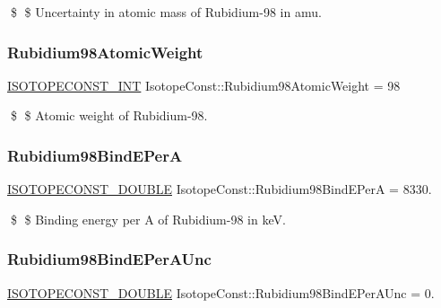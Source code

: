 \$ \$ Uncertainty in atomic mass of Rubidium-\/98 in amu. \mbox{\label{group___isotope_const-_rubidium-_rb98_ga1569a0c394f855620b03ae0b3e708c9c}} 
\subsubsection{\texorpdfstring{Rubidium98\+Atomic\+Weight}{Rubidium98AtomicWeight}}
{\footnotesize\ttfamily \mbox{\hyperlink{group___isotope_const-_macros_ga5f18360b3e99483a35c32d789e62621c}{I\+S\+O\+T\+O\+P\+E\+C\+O\+N\+S\+T\+\_\+\+I\+NT}} Isotope\+Const\+::\+Rubidium98\+Atomic\+Weight = 98}

\$ \$ Atomic weight of Rubidium-\/98. \mbox{\label{group___isotope_const-_rubidium-_rb98_ga341e9c8b9a782a81085c58371df45198}} 
\subsubsection{\texorpdfstring{Rubidium98\+Bind\+E\+PerA}{Rubidium98BindEPerA}}
{\footnotesize\ttfamily \mbox{\hyperlink{group___isotope_const-_macros_ga8f45a7272ce02c0b4c65c44636ed719a}{I\+S\+O\+T\+O\+P\+E\+C\+O\+N\+S\+T\+\_\+\+D\+O\+U\+B\+LE}} Isotope\+Const\+::\+Rubidium98\+Bind\+E\+PerA = 8330.}

\$ \$ Binding energy per A of Rubidium-\/98 in keV. \mbox{\label{group___isotope_const-_rubidium-_rb98_gab54ae92fa19f4f45d9613a7df9319ec6}} 
\subsubsection{\texorpdfstring{Rubidium98\+Bind\+E\+Per\+A\+Unc}{Rubidium98BindEPerAUnc}}
{\footnotesize\ttfamily \mbox{\hyperlink{group___isotope_const-_macros_ga8f45a7272ce02c0b4c65c44636ed719a}{I\+S\+O\+T\+O\+P\+E\+C\+O\+N\+S\+T\+\_\+\+D\+O\+U\+B\+LE}} Isotope\+Const\+::\+Rubidium98\+Bind\+E\+Per\+A\+Unc = 0.}

